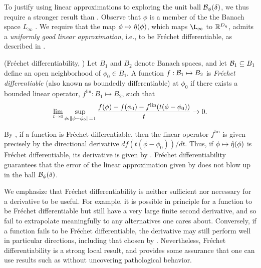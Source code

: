 To justify using linear approximations to exploring the unit ball
$\mathcal{B}_\phi(\delta)$, we thus require a stronger result than
.  Observe that $\phi$ is a member of the the Banach
space $L_\infty$ \citep[Theorem 5.2.1]{dudley:2018:real}.  We require that the
map $\phi \mapsto \hat\eta(\phi)$, which maps $\L_\infty$ to
$\mathbb{R}^{D_{\eta}}$, admits a {\em uniformly good linear approximation}, i.e.,
to be Fr{\'e}chet differentiable, as described in .

\begin{defn}
    (Fr{\'e}chet differentiability,
    \citep[Definition 4.5]{zeidler:2013:functional})
%
Let $B_1$ and $B_2$ denote Banach spaces, and let $\mathcal{B}_1 \subseteq B_1$ define
an open neighborhood of $\phi_0 \in B_1$.
%
A function $f: \mathcal{B}_1 \mapsto B_2$ is {\em Fr{\'echet} differentiable} (also
known as boundedly differentiable) at $\phi_0$ if there exists a  bounded linear
operator, $f^{\mathrm{lin}}: B_1 \mapsto B_2$, such that
%
\begin{align*}
%
\lim_{t \rightarrow 0}
    \sup_{\phi: \norm{\phi - \phi_0} = 1}
    \frac{f(\phi) - f(\phi_0) -
          f^{\mathrm{lin}}(t (\phi - \phi_0))
         }{t} \rightarrow 0.
%
\end{align*}
%
\end{defn}

By \citep[Proposition 4.8]{zeidler:2013:functional}, if a function is
Fr{\'e}chet differentiable, then the linear operator $f^{\mathrm{lin}}$ is given
precisely by the directional derivative $d f(t (\phi - \phi_0)) / d t$. Thus, if
$\phi \mapsto \hat\eta(\phi)$ is Fr{\'e}chet differentiable, its derivative is
given by .  Fr{\'e}chet differentiability guarantees
that the error of the linear approximation given by 
does not blow up in the ball $\mathcal{B}_\phi(\delta)$.

We emphasize that Fr{\'e}chet differentiability is neither sufficient nor
necessary for a derivative to be useful.  For example, it is possible in
principle for a function to be Fr{\'e}chet differentiable but still have a very
large finite second derivative, and so fail to extrapolate meaningfully to any
alternatives one cares about.  Conversely, if a function fails to be Fr{\'e}chet
differentiable, the derivative may still perform well in particular directions,
including that chosen by .  Nevertheless, Fr{\'e}chet
differentiability is a strong local result, and provides some assurance that one
can use results such as  without uncovering
pathological behavior.

